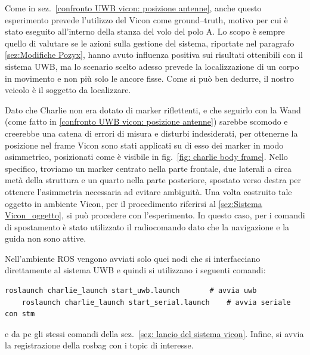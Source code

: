 Come in sez.~\ref{confronto UWB vicon: posizione antenne}, anche questo esperimento prevede l'utilizzo del Vicon come ground--truth, motivo per cui è stato eseguito all'interno della stanza del volo del polo A. 
Lo scopo è sempre quello di valutare se le azioni sulla gestione del sistema, riportate nel paragrafo \ref{sez:Modifiche Pozyx}, hanno avuto influenza positiva sui risultati ottenibili con il sistema UWB, ma lo scenario scelto adesso prevede la localizzazione di un corpo in movimento e non più solo le ancore fisse. 
Come si può ben dedurre, il nostro veicolo è il soggetto da localizzare.

Dato che Charlie non era dotato di marker riflettenti, e che seguirlo con la Wand (come fatto in \ref{confronto UWB vicon: posizione antenne}) sarebbe scomodo e creerebbe una catena di errori di misura e disturbi indesiderati, per ottenerne la posizione nel frame Vicon sono stati applicati su di esso dei marker in modo asimmetrico, posizionati come \`e visibile in fig.~\ref{fig: charlie body frame}. 
Nello specifico, troviamo un marker centrato nella parte frontale, due laterali a circa metà della struttura e un quarto nella parte posteriore, spostato verso destra per ottenere l'asimmetria necessaria ad evitare ambiguità.
Una volta costruito tale oggetto in ambiente Vicon, per il procedimento riferirsi al \ref{sez:Sistema Vicon_oggetto}, si può procedere con l'esperimento. 
In questo caso, per i comandi di spostamento è stato utilizzato il radiocomando dato che la navigazione e la guida non sono attive.

% 

Nell'ambiente ROS vengono avviati solo quei nodi che si interfacciano direttamente al sistema UWB e quindi si utilizzano i seguenti comandi:
\begin{lstlisting}[style=bash]
	roslaunch charlie_launch start_uwb.launch		# avvia uwb
	roslaunch charlie_launch start_serial.launch	# avvia seriale con stm
\end{lstlisting}
e da pc gli stessi comandi della sez.~\ref{sez: lancio del sistema vicon}.
Infine, si avvia la registrazione della rosbag con i topic di interesse.

